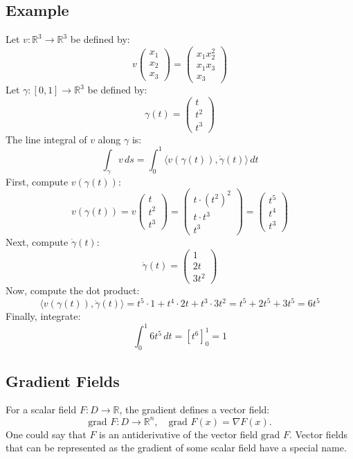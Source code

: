 \documentclass{article}
\begin{document}
\subsection*{Example}
Let \( v: \mathbb{R}^3 \to \mathbb{R}^3 \) be defined by:
\[
v \begin{pmatrix} x_1 \\ x_2 \\ x_3 \end{pmatrix} = \begin{pmatrix} x_1 x_2^2 \\ x_1 x_3 \\ x_3 \end{pmatrix}
\]
Let \( \gamma: [0, 1] \to \mathbb{R}^3 \) be defined by:
\[
\gamma(t) = \begin{pmatrix} t \\ t^2 \\ t^3 \end{pmatrix}
\]
The line integral of \( v \) along \( \gamma \) is:
\[
\int_{\gamma} v \, ds = \int_{0}^{1} \langle v(\gamma(t)), \dot{\gamma}(t) \rangle \, dt
\]
First, compute \( v(\gamma(t)) \):
\[
v(\gamma(t)) = v \begin{pmatrix} t \\ t^2 \\ t^3 \end{pmatrix} = \begin{pmatrix} t \cdot (t^2)^2 \\ t \cdot t^3 \\ t^3 \end{pmatrix} = \begin{pmatrix} t^5 \\ t^4 \\ t^3 \end{pmatrix}
\]
Next, compute \( \dot{\gamma}(t) \):
\[
\dot{\gamma}(t) = \begin{pmatrix} 1 \\ 2t \\ 3t^2 \end{pmatrix}
\]
Now, compute the dot product:
\[
\langle v(\gamma(t)), \dot{\gamma}(t) \rangle = t^5 \cdot 1 + t^4 \cdot 2t + t^3 \cdot 3t^2 = t^5 + 2t^5 + 3t^5 = 6t^5
\]
Finally, integrate:
\[
\int_{0}^{1} 6t^5 \, dt = \left[ t^6 \right]_{0}^{1} = 1
\]
\subsection{Gradient Fields}
For a scalar field \( F : D \rightarrow \mathbb{R} \), the gradient defines a vector field:
\[
\text{grad } F : D \rightarrow \mathbb{R}^n, \quad \text{grad } F(x) = \nabla F(x).
\]
One could say that \( F \) is an antiderivative of the vector field \( \text{grad } F \). Vector fields that can be represented as the gradient of some scalar field have a special name.
\end{document}
